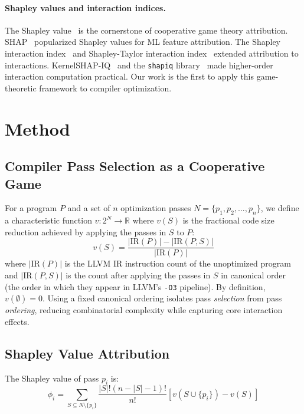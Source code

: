 \documentclass{article}
\newcommand{\sv}{\phi}
\newcommand{\coal}{S}
\newcommand{\passes}{N}
\newcommand{\val}{v}
\begin{document}
\paragraph{Shapley values and interaction indices.}
The Shapley value~\citep{shapley1953value} is the cornerstone of cooperative game theory attribution. SHAP~\citep{lundberg2017unified} popularized Shapley values for ML feature attribution. The Shapley interaction index~\citep{grabisch1999axiomatic} and Shapley-Taylor interaction index~\citep{sundararajan2020shapley} extended attribution to interactions. KernelSHAP-IQ~\citep{fumagalli2024kernelshap} and the \texttt{shapiq} library~\citep{muschalik2024shapiq} made higher-order interaction computation practical. Our work is the first to apply this game-theoretic framework to compiler optimization.

\section{Method}
\label{sec:method}

\subsection{Compiler Pass Selection as a Cooperative Game}

For a program $P$ and a set of $n$ optimization passes $\passes = \{p_1, p_2, \ldots, p_n\}$, we define a characteristic function $\val: 2^{\passes} \to \mathbb{R}$ where $\val(\coal)$ is the fractional code size reduction achieved by applying the passes in $\coal$ to $P$:
\begin{equation}
    \val(\coal) = \frac{|\text{IR}(P)| - |\text{IR}(P, \coal)|}{|\text{IR}(P)|}
\end{equation}
where $|\text{IR}(P)|$ is the LLVM IR instruction count of the unoptimized program and $|\text{IR}(P, \coal)|$ is the count after applying the passes in $\coal$ in canonical order (the order in which they appear in LLVM's \texttt{-O3} pipeline). By definition, $\val(\emptyset) = 0$. Using a fixed canonical ordering isolates pass \emph{selection} from pass \emph{ordering}, reducing combinatorial complexity while capturing core interaction effects.

\subsection{Shapley Value Attribution}

The Shapley value of pass $p_i$ is:
\begin{equation}
    \sv_i = \sum_{\coal \subseteq \passes \setminus \{p_i\}} \frac{|\coal|!(n-|\coal|-1)!}{n!} \left[\val(\coal \cup \{p_i\}) - \val(\coal)\right]
\label{eq:shapley}
\end{equation}
\end{document}
